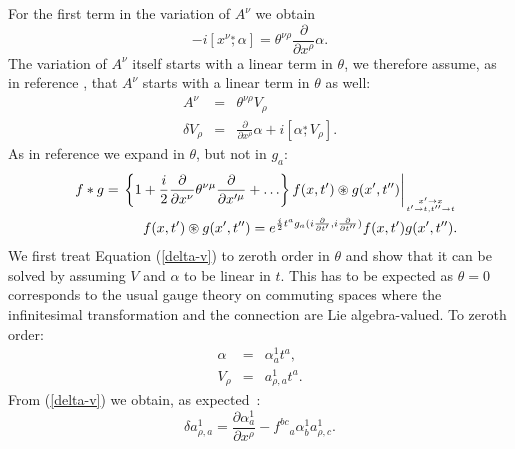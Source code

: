 \documentclass[a4paper,11pt]{article}
\def\nn{\nonumber }
\def\ds{\stackrel{*}{,}}
\def\pat{\partial}
\begin{document}
For the first term in the variation of $A^{\nu}$ we obtain
\begin{equation}
\label{x-alpha-kommu}
  -i[x^{\nu}\ds\alpha]=\theta^{\nu\rho}\frac{\pat}{\pat x^{\rho}}\alpha.
\end{equation}
The variation of $A^{\nu}$ itself starts with a linear term in $\theta$, 
we therefore assume, as in reference \cite{MSSW}, that $A^{\nu}$ starts with a 
linear term in $\theta$ as well:
\begin{eqnarray}
\label{delta-v}
  A^{\nu}&=&\theta^{\nu\rho}V_{\rho}\nn\\
  \delta V_{\rho}&=&\frac{\pat}{\pat x^{\rho}}\alpha+i[\alpha\ds V_{\rho}].
\end{eqnarray}
As in reference \cite{MSSW} we expand in $\theta$, but not in $g_a$:
\begin{eqnarray}
  \label{xt-star}
  &&f*g=\left.\left\{1+\frac{i}{2}\frac{\pat}{\pat x^{\nu}}\theta^{\nu\mu}\frac{\pat}{\pat x'^{\mu}}+\ldots\right\}f(x,t')\circledast g(x',t'')\right|_{x'\to x\atop t'\to t, t''\to t}\nn\\
  &&f(x,t')\circledast g(x',t'')=e^{\frac{i}{2}t^ag_a(i\frac{\pat}{\pat t'},i\frac{\pat}{\pat t''})}f(x,t')g(x',t'').
\end{eqnarray}
We first treat Equation (\ref{delta-v}) to zeroth order in $\theta$ 
and show that it can be solved by assuming $V$ and $\alpha$
to be linear in $t$. This has to be expected as $\theta=0$
corresponds to the usual gauge theory on commuting spaces
where the infinitesimal transformation and the connection
are Lie algebra-valued. To zeroth order:
\begin{eqnarray}
  \alpha&=&\alpha^{1}_at^a,\nn\\
  V_{\rho}&=&a^{1}_{\rho,a}t^a.
\end{eqnarray}
From (\ref{delta-v}) we obtain, as expected~\cite{JSW2}:
\begin{equation}
\label{delta-a}
  \delta a^1_{\rho,a}=\frac{\pat \alpha^1_a}{\pat x^{\rho}}-f^{bc}{}_a\alpha^{1}_ba^{1}_{\rho,c}.
\end{equation}
\end{document}
